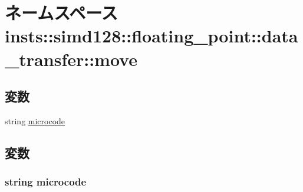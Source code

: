 \hypertarget{namespaceinsts_1_1simd128_1_1floating__point_1_1data__transfer_1_1move}{
\section{ネームスペース insts::simd128::floating\_\-point::data\_\-transfer::move}
\label{namespaceinsts_1_1simd128_1_1floating__point_1_1data__transfer_1_1move}
}
\subsection*{変数}
\begin{DoxyCompactItemize}
\item 
string \hyperlink{namespaceinsts_1_1simd128_1_1floating__point_1_1data__transfer_1_1move_a770f11a173e99389a8802f0107ed8f52}{microcode}
\end{DoxyCompactItemize}


\subsection{変数}
\hypertarget{namespaceinsts_1_1simd128_1_1floating__point_1_1data__transfer_1_1move_a770f11a173e99389a8802f0107ed8f52}{
\subsubsection[{microcode}]{\setlength{\rightskip}{0pt plus 5cm}string {\bf microcode}}}
\label{namespaceinsts_1_1simd128_1_1floating__point_1_1data__transfer_1_1move_a770f11a173e99389a8802f0107ed8f52}
